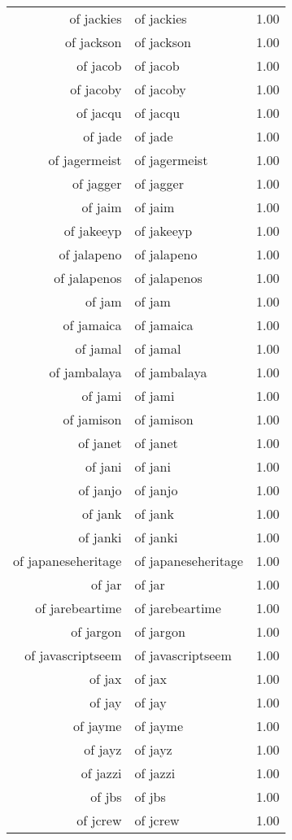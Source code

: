 \begin{table}[ht]
\begin{tabular}{rlr}
  of jackies & of jackies & 1.00 \\ 
  of jackson & of jackson & 1.00 \\ 
  of jacob & of jacob & 1.00 \\ 
  of jacoby & of jacoby & 1.00 \\ 
  of jacqu & of jacqu & 1.00 \\ 
  of jade & of jade & 1.00 \\ 
  of jagermeist & of jagermeist & 1.00 \\ 
  of jagger & of jagger & 1.00 \\ 
  of jaim & of jaim & 1.00 \\ 
  of jakeeyp & of jakeeyp & 1.00 \\ 
  of jalapeno & of jalapeno & 1.00 \\ 
  of jalapenos & of jalapenos & 1.00 \\ 
  of jam & of jam & 1.00 \\ 
  of jamaica & of jamaica & 1.00 \\ 
  of jamal & of jamal & 1.00 \\ 
  of jambalaya & of jambalaya & 1.00 \\ 
  of jami & of jami & 1.00 \\ 
  of jamison & of jamison & 1.00 \\ 
  of janet & of janet & 1.00 \\ 
  of jani & of jani & 1.00 \\ 
  of janjo & of janjo & 1.00 \\ 
  of jank & of jank & 1.00 \\ 
  of janki & of janki & 1.00 \\ 
  of japaneseheritage & of japaneseheritage & 1.00 \\ 
  of jar & of jar & 1.00 \\ 
  of jarebeartime & of jarebeartime & 1.00 \\ 
  of jargon & of jargon & 1.00 \\ 
  of javascriptseem & of javascriptseem & 1.00 \\ 
  of jax & of jax & 1.00 \\ 
  of jay & of jay & 1.00 \\ 
  of jayme & of jayme & 1.00 \\ 
  of jayz & of jayz & 1.00 \\ 
  of jazzi & of jazzi & 1.00 \\ 
  of jbs & of jbs & 1.00 \\ 
  of jcrew & of jcrew & 1.00 \\ 

\end{tabular}
\end{table}
